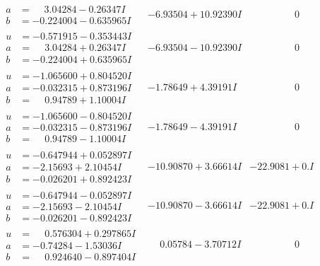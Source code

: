 \documentclass[1p]{elsarticle_modified}
\theoremstyle{definition}
\begin{document}
$$\begin{array}{c|c|c}
\begin{aligned}
a &= \phantom{-}3.04284 - 0.26347 I \\
b &= -0.224004 - 0.635965 I\end{aligned}
 & -6.93504 + 10.92390 I & \phantom{-0.000000 } 0 \\ \hline\begin{aligned}
u &= -0.571915 - 0.353443 I \\
a &= \phantom{-}3.04284 + 0.26347 I \\
b &= -0.224004 + 0.635965 I\end{aligned}
 & -6.93504 - 10.92390 I & \phantom{-0.000000 } 0 \\ \hline\begin{aligned}
u &= -1.065600 + 0.804520 I \\
a &= -0.032315 + 0.873196 I \\
b &= \phantom{-}0.94789 + 1.10004 I\end{aligned}
 & -1.78649 + 4.39191 I & \phantom{-0.000000 } 0 \\ \hline\begin{aligned}
u &= -1.065600 - 0.804520 I \\
a &= -0.032315 - 0.873196 I \\
b &= \phantom{-}0.94789 - 1.10004 I\end{aligned}
 & -1.78649 - 4.39191 I & \phantom{-0.000000 } 0 \\ \hline\begin{aligned}
u &= -0.647944 + 0.052897 I \\
a &= -2.15693 + 2.10454 I \\
b &= -0.026201 + 0.892423 I\end{aligned}
 & -10.90870 + 3.66614 I & -22.9081 + 0. I\phantom{ +0.000000I} \\ \hline\begin{aligned}
u &= -0.647944 - 0.052897 I \\
a &= -2.15693 - 2.10454 I \\
b &= -0.026201 - 0.892423 I\end{aligned}
 & -10.90870 - 3.66614 I & -22.9081 + 0. I\phantom{ +0.000000I} \\ \hline\begin{aligned}
u &= \phantom{-}0.576304 + 0.297865 I \\
a &= -0.74284 - 1.53036 I \\
b &= \phantom{-}0.924640 - 0.897404 I\end{aligned}
 & \phantom{-}0.05784 - 3.70712 I & \phantom{-0.000000 } 0 \\ \hline\begin{aligned}

\end{aligned}
\end{array}$$
\end{document}
